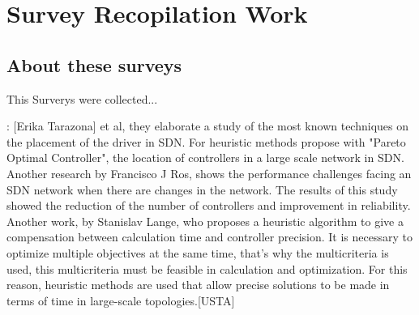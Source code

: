 \documentclass[a4paper,10pt]{article}
\begin{document}


\section{Survey Recopilation Work}
\subsection{About these surveys}
This Surverys were collected...

\cite{TaAl17}: [Erika Tarazona] et al, they elaborate a study of the most known techniques on the placement of the driver in SDN.
For heuristic methods propose with "Pareto Optimal Controller", the location of controllers in a large scale network in SDN.
Another research by Francisco J Ros, shows the performance challenges facing an SDN network when there are changes in the network. The results of this study showed the reduction of the number of controllers and improvement in reliability.
Another work, by Stanislav Lange, who proposes a heuristic algorithm to give a compensation between calculation time and controller precision.
It is necessary to optimize multiple objectives at the same time, that's why the multicriteria is used, this multicriteria must be feasible in calculation and optimization. For this reason, heuristic methods are used that allow precise solutions to be made in terms of time in large-scale topologies.[USTA]
\end{document}
